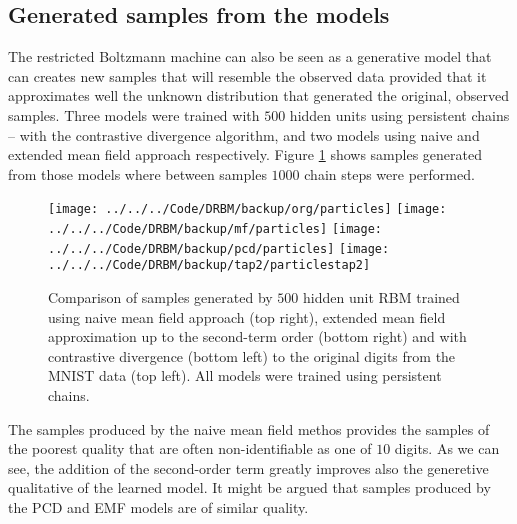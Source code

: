 \subsection{Generated samples from the models}
The restricted Boltzmann machine can also be seen as a generative model that can creates new samples that will resemble the observed data provided that it approximates well the unknown distribution that generated the original, observed samples. Three models were trained with $500$ hidden units using persistent chains -- with the contrastive divergence algorithm, and two models using naive and extended mean field approach respectively. Figure \ref{fig:particles} shows samples generated from those models where between samples $1000$ chain steps were performed.
\begin{figure}[!htb]
%
 \texttt{[image: ../../../Code/DRBM/backup/org/particles]}
\endminipage 
\hfill
{}  
 \texttt{[image: ../../../Code/DRBM/backup/mf/particles]}
\endminipage
\vspace{2em}
 \texttt{[image: ../../../Code/DRBM/backup/pcd/particles]}
\endminipage 
\hfill
{}  
 \texttt{[image: ../../../Code/DRBM/backup/tap2/particlestap2]}
\endminipage
  \caption[1]{Comparison of samples generated by $500$ hidden unit RBM trained using naive mean field approach (top right), extended mean field approximation up to the second-term order (bottom right) and with contrastive divergence (bottom left) to the original digits from the MNIST data (top left). All models were trained using persistent chains.}
  \label{fig:particles}
\end{figure}
The samples produced by the naive mean field methos provides the samples of the poorest quality that are often non-identifiable as one of $10$ digits. As we can see, the addition of the second-order term greatly improves also the generetive qualitative of the learned model. It might be argued that samples produced by the PCD and EMF models are of similar quality.
